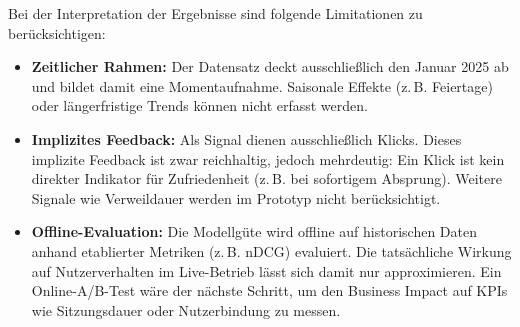 Bei der Interpretation der Ergebnisse sind folgende Limitationen zu berücksichtigen:
\begin{itemize}
    \item \textbf{Zeitlicher Rahmen:} Der Datensatz deckt ausschließlich den Januar 2025 ab und bildet damit eine Momentaufnahme. Saisonale Effekte (z.\,B. Feiertage) oder längerfristige Trends können nicht erfasst werden.
    \item \textbf{Implizites Feedback:} Als Signal dienen ausschließlich Klicks. Dieses implizite Feedback ist zwar reichhaltig, jedoch mehrdeutig: Ein Klick ist kein direkter Indikator für Zufriedenheit (z.\,B. bei sofortigem Absprung). Weitere Signale wie Verweildauer werden im Prototyp nicht berücksichtigt.
    \item \textbf{Offline-Evaluation:} Die Modellgüte wird offline auf historischen Daten anhand etablierter Metriken (z.\,B. \ac{nDCG}) evaluiert. Die tatsächliche Wirkung auf Nutzerverhalten im Live-Betrieb lässt sich damit nur approximieren. Ein Online-A/B-Test wäre der nächste Schritt, um den Business Impact auf KPIs wie Sitzungsdauer oder Nutzerbindung zu messen.
\end{itemize}